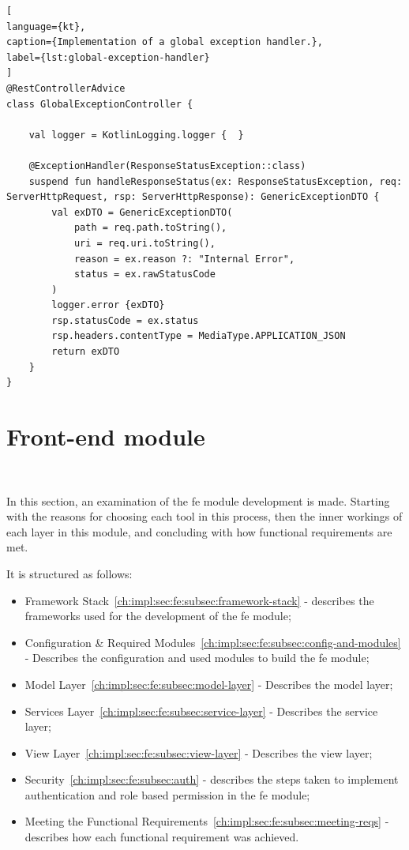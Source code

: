 \begin{lstlisting}[
language={kt},
caption={Implementation of a global exception handler.},
label={lst:global-exception-handler}
]
@RestControllerAdvice
class GlobalExceptionController {

    val logger = KotlinLogging.logger {  }

    @ExceptionHandler(ResponseStatusException::class)
    suspend fun handleResponseStatus(ex: ResponseStatusException, req: ServerHttpRequest, rsp: ServerHttpResponse): GenericExceptionDTO {
        val exDTO = GenericExceptionDTO(
            path = req.path.toString(),
            uri = req.uri.toString(),
            reason = ex.reason ?: "Internal Error",
            status = ex.rawStatusCode
        )
        logger.error {exDTO}
        rsp.statusCode = ex.status
        rsp.headers.contentType = MediaType.APPLICATION_JSON
        return exDTO
    }
}
\end{lstlisting}



\section{Front-end module}~\label{ch:impl:sec:fe}

In this section, an examination of the \acrlong{fe} module development is made. Starting with the reasons for choosing each tool in this process, then the inner workings of each layer in this module, and concluding with how functional requirements are met.


It is structured as follows:

\begin{itemize}
    \item Framework Stack~\ref{ch:impl:sec:fe:subsec:framework-stack} - describes the frameworks used for the development of the \acrlong{fe} module;
    \item Configuration \& Required Modules~\ref{ch:impl:sec:fe:subsec:config-and-modules} - Describes the configuration and used modules to build the \acrlong{fe} module;
    \item Model Layer~\ref{ch:impl:sec:fe:subsec:model-layer} - Describes the model layer;
    \item Services Layer~\ref{ch:impl:sec:fe:subsec:service-layer} - Describes the service layer;
    \item View Layer~\ref{ch:impl:sec:fe:subsec:view-layer} - Describes the view layer;
    \item Security~\ref{ch:impl:sec:fe:subsec:auth} - describes the steps taken to implement authentication and role based permission in the \acrlong{fe} module;
    \item Meeting the Functional Requirements~\ref{ch:impl:sec:fe:subsec:meeting-reqs} - describes how each functional requirement was achieved.
\end{itemize}


